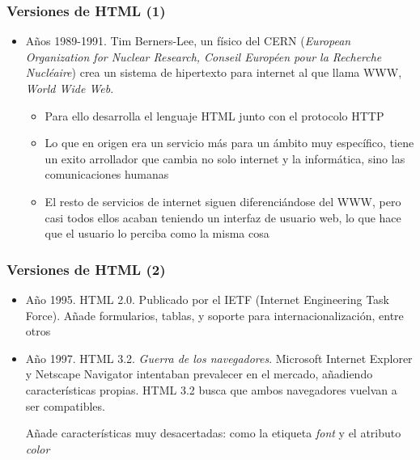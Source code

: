 \documentclass[ucs]{beamer}
\begin{document}
\begin{frame}[fragile]
\frametitle{Versiones de HTML (1)}
\begin{itemize}
\item
Años 1989-1991. Tim Berners-Lee, un físico del CERN (\emph{European Organization for Nuclear Research, 
Conseil Européen pour la Recherche Nucléaire}) crea un sistema
de hipertexto para internet al que llama WWW,
\emph{World Wide Web}.



    \begin{itemize}
    \item
Para ello desarrolla el lenguaje HTML
junto con el protocolo HTTP 
    \item
Lo que en origen era un servicio más para un ámbito muy específico, 
tiene un exito arrollador que cambia no solo internet y la informática,
sino las comunicaciones humanas
    \item
El resto de servicios de internet siguen diferenciándose del WWW, pero casi
todos ellos acaban teniendo un interfaz de usuario web, lo que hace que
el usuario lo perciba como la misma cosa
    \end{itemize}


\end{itemize}
\end{frame}

\begin{frame}[fragile]
\frametitle{Versiones de HTML (2)}
\begin{itemize}

\item
Año 1995. HTML 2.0. Publicado por el IETF (Internet Engineering Task Force). Añade formularios, tablas,
y soporte para internacionalización, entre otros

\item
Año 1997. HTML 3.2. 
\emph{Guerra de los navegadores}. Microsoft Internet Explorer y Netscape Navigator
intentaban prevalecer en el mercado, añadiendo características propias.
HTML 3.2 busca que ambos navegadores vuelvan a ser compatibles.

Añade características  muy desacertadas: como la etiqueta 
\emph{font}
y el atributo
\emph{color} 


\end{itemize}

\end{frame}
\end{document}
